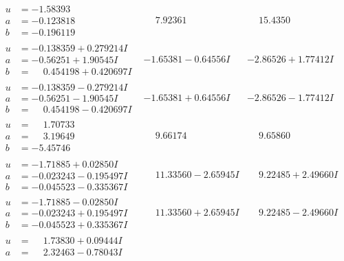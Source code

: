 \documentclass[1p]{elsarticle_modified}
\theoremstyle{definition}
\begin{document}
$$\begin{array}{c|c|c}
\begin{aligned}
u &= -1.58393\phantom{ +0.000000I} \\
a &= -0.123818\phantom{ +0.000000I} \\
b &= -0.196119\phantom{ +0.000000I}\end{aligned}
 & \phantom{-}7.92361\phantom{ +0.000000I} & \phantom{-}15.4350\phantom{ +0.000000I} \\ \hline\begin{aligned}
u &= -0.138359 + 0.279214 I \\
a &= -0.56251 + 1.90545 I \\
b &= \phantom{-}0.454198 + 0.420697 I\end{aligned}
 & -1.65381 - 0.64556 I & -2.86526 + 1.77412 I \\ \hline\begin{aligned}
u &= -0.138359 - 0.279214 I \\
a &= -0.56251 - 1.90545 I \\
b &= \phantom{-}0.454198 - 0.420697 I\end{aligned}
 & -1.65381 + 0.64556 I & -2.86526 - 1.77412 I \\ \hline\begin{aligned}
u &= \phantom{-}1.70733\phantom{ +0.000000I} \\
a &= \phantom{-}3.19649\phantom{ +0.000000I} \\
b &= -5.45746\phantom{ +0.000000I}\end{aligned}
 & \phantom{-}9.66174\phantom{ +0.000000I} & \phantom{-}9.65860\phantom{ +0.000000I} \\ \hline\begin{aligned}
u &= -1.71885 + 0.02850 I \\
a &= -0.023243 - 0.195497 I \\
b &= -0.045523 - 0.335367 I\end{aligned}
 & \phantom{-}11.33560 - 2.65945 I & \phantom{-}9.22485 + 2.49660 I \\ \hline\begin{aligned}
u &= -1.71885 - 0.02850 I \\
a &= -0.023243 + 0.195497 I \\
b &= -0.045523 + 0.335367 I\end{aligned}
 & \phantom{-}11.33560 + 2.65945 I & \phantom{-}9.22485 - 2.49660 I \\ \hline\begin{aligned}
u &= \phantom{-}1.73830 + 0.09444 I \\
a &= \phantom{-}2.32463 - 0.78043 I \\

\end{aligned}
\end{array}$$
\end{document}
